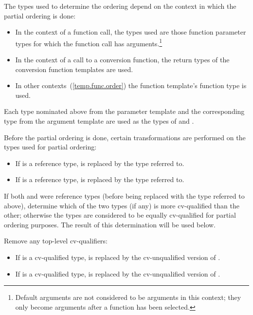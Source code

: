 \pnum
The types used to determine the ordering depend on the context in which
the partial ordering is done:

\begin{itemize}
\item
In the context of a function call, the types used are those function parameter types
for which the function call has arguments.\footnote{Default arguments
are not considered to be arguments in this context; they only become arguments
after a function has been selected.}
\item
In the context of a call to a conversion function, the return types of
the conversion function templates are used.
\item
In other contexts~(\ref{temp.func.order}) the function template's function
type is used.
\end{itemize}

\pnum
Each type nominated above from the parameter template and the corresponding type from the
argument template are used as the types of
and
.

\pnum
Before the partial ordering is done, certain transformations are performed
on the types used for partial ordering:

\begin{itemize}
\item
If
is a reference type,
is replaced by the type referred to.
\item
If
is a reference type,
is replaced by the type referred to.
\end{itemize}

\pnum
If both
and
were reference types (before being replaced with the type referred to
above), determine which of the two types (if any) is more cv-qualified
than the other; otherwise the types are considered to be equally
cv-qualified for partial ordering purposes. The result of this
determination will be used below.

\pnum
Remove any top-level cv-qualifiers:
\begin{itemize}
\item
If
is a cv-qualified type,
is replaced by the cv-unqualified version of
.
\item
If
is a cv-qualified type,
is replaced by the cv-unqualified version of
.
\end{itemize}

